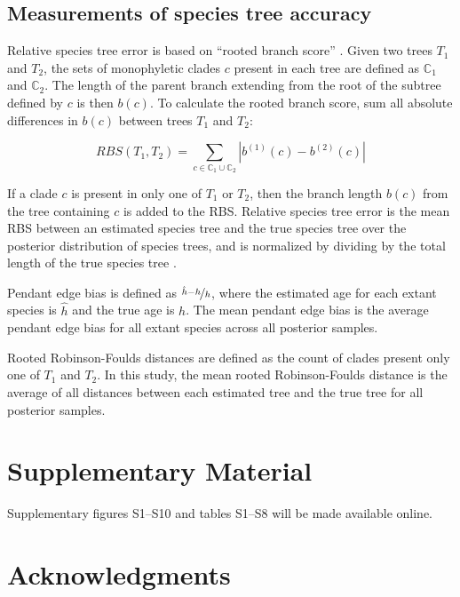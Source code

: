 \documentclass[nogrid]{MBE}%
\begin{document}
\subsection{Measurements of species tree accuracy}

Relative species tree error is based on ``rooted branch score''
\citep[RBS;][]{Heled2013}. Given two trees $T_1$ and $T_2$, the sets of
monophyletic clades $c$ present in each tree are defined as $\mathbb{C}_1$ and
$\mathbb{C}_2$. The length of the parent branch extending from the root of the
subtree defined by $c$ is then $b(c)$. To calculate the rooted branch score, sum
all absolute differences in $b(c)$ between trees $T_1$ and $T_2$:

\begin{equation}
RBS(T_1, T_2) = \sum_{c \in {\mathbb{C}_1} \cup {\mathbb{C}_2}} |b^{(1)}(c) - b^{(2)}(c)|
\end{equation}

If a clade $c$ is present in only one of $T_1$ or $T_2$, then the branch length
$b(c)$ from the tree containing $c$ is added to the RBS. Relative species tree
error is the mean RBS between an estimated species tree and the true
species tree over the posterior distribution of species trees, and is normalized
by dividing by the total length of the true species tree
\citep{Ogilvie01052016}.

Pendant edge bias is defined as $\nicefrac{\hat{h} - h}{h}$, where the estimated
age for each extant species is $\hat{h}$ and the true age is $h$. The mean
pendant edge bias is the average pendant edge bias for all extant species across
all posterior samples.

Rooted Robinson-Foulds distances \citep{ROBINSON1981131} are defined as the
count of clades present only one of $T_1$ and $T_2$. In this study, the mean
rooted Robinson-Foulds distance is the average of all distances between each
estimated tree and the true tree for all posterior samples.

\section{Supplementary Material}
Supplementary figures S1--S10 and tables S1--S8 will be made available online.

\section{Acknowledgments}
\end{document}
